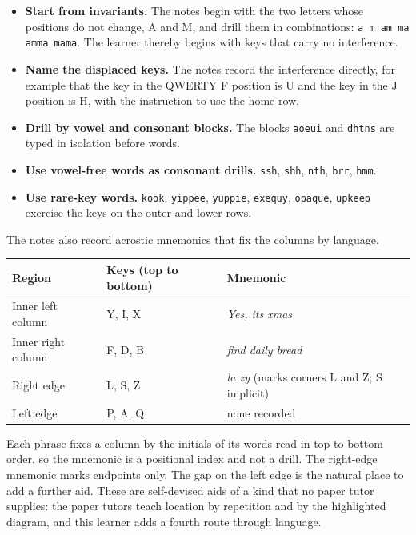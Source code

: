 \begin{itemize}
\item \textbf{Start from invariants.} The notes begin with the two letters whose positions do not change, A and M, and drill them in combinations: \texttt{a m am ma amma mama}. The learner thereby begins with keys that carry no interference.
\item \textbf{Name the displaced keys.} The notes record the interference directly, for example that the key in the QWERTY F position is U and the key in the J position is H, with the instruction to use the home row.
\item \textbf{Drill by vowel and consonant blocks.} The blocks \texttt{aoeui} and \texttt{dhtns} are typed in isolation before words.
\item \textbf{Use vowel-free words as consonant drills.} \texttt{ssh}, \texttt{shh}, \texttt{nth}, \texttt{brr}, \texttt{hmm}.
\item \textbf{Use rare-key words.} \texttt{kook}, \texttt{yippee}, \texttt{yuppie}, \texttt{exequy}, \texttt{opaque}, \texttt{upkeep} exercise the keys on the outer and lower rows.
\end{itemize}

The notes also record acrostic mnemonics that fix the columns by language.

\begin{center}
\begin{tabular}{@{}lll@{}}
\toprule
Region & Keys (top to bottom) & Mnemonic \\
\midrule
Inner left column & Y, I, X & \emph{Yes, its xmas} \\
Inner right column & F, D, B & \emph{find daily bread} \\
Right edge & L, S, Z & \emph{la zy} (marks corners L and Z; S implicit) \\
Left edge & P, A, Q & none recorded \\
\bottomrule
\end{tabular}
\end{center}

Each phrase fixes a column by the initials of its words read in top-to-bottom order, so the mnemonic is a positional index and not a drill. The right-edge mnemonic marks endpoints only. The gap on the left edge is the natural place to add a further aid. These are self-devised aids of a kind that no paper tutor supplies: the paper tutors teach location by repetition and by the highlighted diagram, and this learner adds a fourth route through language.

